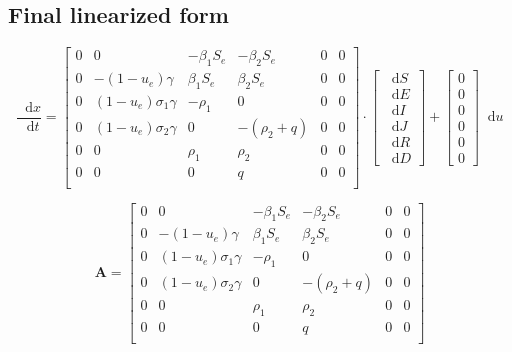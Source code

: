 \documentclass[fleqn]{article}
\newcommand*\diff{\mathop{}\!\mathrm{d}}
\begin{document}
\subsection*{Final linearized form}
\begin{equation*}
    \dfrac{\diff x}{\diff t} = \begin{bmatrix}
        0 & 0 & {-\beta_1 S_e} & {-\beta_2 S_e} & 0 & 0 \\
        0 & -(1 - u_e) \gamma & {\beta_1 S_e} & {\beta_2 S_e} & 0 & 0 \\
        0 & (1 - u_e) \sigma_1 \gamma & -\rho_1 & 0 & 0 & 0 \\
        0 & (1 - u_e) \sigma_2 \gamma & 0 & -(\rho_2 + q) & 0 & 0 \\
        0 & 0 & \rho_1 & \rho_2 & 0 & 0 \\
        0 & 0 & 0 & q & 0 & 0 \\
    \end{bmatrix} \cdot \begin{bmatrix}
        \diff S \\
        \diff E \\
        \diff I \\
        \diff J \\
        \diff R \\
        \diff D
    \end{bmatrix} + \begin{bmatrix}
        0 \\
        0 \\
        0 \\
        0 \\
        0 \\
        0
    \end{bmatrix} \diff u
\end{equation*}

\begin{equation*}
    \bm{A} = \begin{bmatrix}
        0 & 0 & {-\beta_1 S_e} & {-\beta_2 S_e} & 0 & 0 \\
        0 & -(1 - u_e) \gamma & {\beta_1 S_e} & {\beta_2 S_e} & 0 & 0 \\
        0 & (1 - u_e) \sigma_1 \gamma & -\rho_1 & 0 & 0 & 0 \\
        0 & (1 - u_e) \sigma_2 \gamma & 0 & -(\rho_2 + q) & 0 & 0 \\
        0 & 0 & \rho_1 & \rho_2 & 0 & 0 \\
        0 & 0 & 0 & q & 0 & 0 \\
    \end{bmatrix}
\end{equation*}
\end{document}
